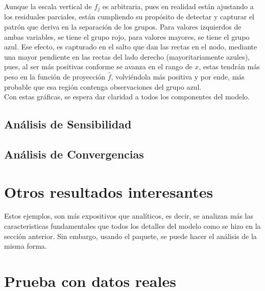 \documentclass[../Main/Main.tex]{subfiles}
\begin{document}
Aunque la escala vertical de $f_j$ es arbitraria, pues en realidad  están ajustando a los residuales parciales, están cumpliendo su propósito de detectar y capturar el patrón que deriva en la separación de los grupos. Para valores izquierdos de ambas variables, se tiene el grupo rojo, para valores mayores, se tiene el grupo azul. Ese efecto, es capturado en el salto que dan las rectas en el nodo, mediante una mayor pendiente en las rectas del lado derecho (mayoritariamente azules), pues, al ser más positivas conforme se avanza en el rango de $x$, estas tendrán más peso en la función de proyección $\hat{f}$, volviéndola más positiva y por ende, más probable que esa región contenga observaciones del grupo azul.\\

Con estas gráficas, se espera dar claridad a todos los componentes del modelo. %


\subsection{Análisis de Sensibilidad}

\subsection{Análisis de Convergencias}


\section{Otros resultados interesantes}
Estos ejemplos, son más expositivos que analíticos, es decir, se analizan más las caracteristicas fundamentales que todos los detalles del modelo como se hizo en la sección anterior. Sin embargo, usando el paquete, se puede hacer el análisis de la misma forma. 

\section{Prueba con datos reales}
\end{document}
